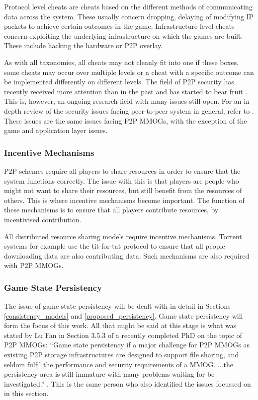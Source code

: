 \documentclass[journal,oneside,a4paper,onecolumn]{IEEEtran}
\begin{document}
Protocol level cheats are cheats based on the different methods of communicating data across the system. These usually concern dropping, delaying of modifying IP packets to achieve certain outcomes in the game. Infrastructure level cheats concern exploiting the underlying infrastructure on which the games are built. These include hacking the hardware or P2P overlay.

As with all taxonomies, all cheats may not cleanly fit into one if these boxes, some cheats may occur over multiple levels or a cheat with a specific outcome can be implemented differently on different levels. The field of P2P security has recently received more attention than in the past and has started to bear fruit \cite{survey_p2p_game_cheats}. This is, however, an ongoing research field with many issues still open. For an in-depth review of the security issues facing peer-to-peer system in general, refer to \cite{p2p_security_issues}. These issues are the same issues facing P2P MMOGs, with the exception of the game and application layer issues.

\subsubsection{Incentive Mechanisms}

P2P schemes require all players to share resources in order to ensure that the system functions correctly. The issue with this is that players are people who might not want to share their resources, but still benefit from the resources of others. This is where incentive mechanisms become important. The function of these mechanisms is to ensure that all players contribute resources, by incentivised contribution.

All distributed resource sharing models require incentive mechanisms. Torrent systems for example use the tit-for-tat protocol \cite{} to ensure that all people downloading data are also contributing data. Such mechanisms are also required with P2P MMOGs. 

\cite{classic_p2p_reputation} \cite{proactive_reputation}

\subsubsection{Game State Persistency}

The issue of game state persistency will be dealt with in detail in Sections \ref{consistency_models} and \ref{proposed_persistency}. Game state persistency will form the focus of this work. All that might be said at this stage is what was stated by Lu Fan in Section 3.5.3 of a recently completed PhD on the topic of P2P MMOGs: ``Game state persistency if a major challenge for P2P MMOGs as existing P2P storage infrastructures are designed to support file sharing, and seldom fulfil the performance and security requirements of a MMOG. ...the persistency area is still immature with many problems waiting for be investigated.'' \cite{Fan_phd}. This is the same person who also identified the issues focussed on in this section.
\end{document}
